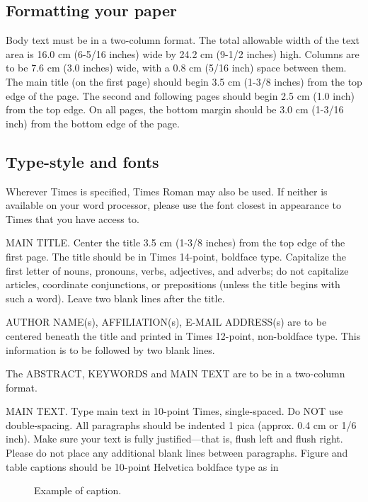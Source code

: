 \subsection{Formatting your paper}

Body text must be in a two-column format. The total allowable width of
the text area is 16.0 cm (6-5/16 inches) wide by 24.2 cm (9-1/2
inches) high. Columns are to be 7.6 cm (3.0 inches) wide, with a 0.8 cm
(5/16 inch) space between them. The main title (on the first page)
should begin 3.5 cm (1-3/8 inches) from the top edge of the page. The
second and following pages should begin 2.5 cm (1.0 inch) from the top
edge. On all pages, the bottom margin should be 3.0 cm (1-3/16 inch)
from the bottom edge of the page.

\subsection{Type-style and fonts}

Wherever Times is specified, Times Roman may also be used. If neither is 
available on your word processor, please use the font closest in 
appearance to Times that you have access to.

MAIN TITLE. Center the title 3.5 cm (1-3/8 inches) from the top edge of 
the first page. The title should be in Times 14-point, boldface type. 
Capitalize the first letter of nouns, pronouns, verbs, adjectives, and 
adverbs; do not capitalize articles, coordinate conjunctions, or 
prepositions (unless the title begins with such a word). Leave two blank 
lines after the title.

AUTHOR NAME(s), AFFILIATION(s), E-MAIL ADDRESS(s) are to be centered
beneath the title and printed in Times 12-point, non-boldface
type. This information is to be followed by two blank lines.

The ABSTRACT, KEYWORDS and MAIN TEXT are to be in a two-column format. 

MAIN TEXT. Type main text in 10-point Times, single-spaced. Do NOT use 
double-spacing. All paragraphs should be indented 1 pica (approx. 
0.4 cm or 1/6 inch). Make sure your text is fully justified---that is, 
flush left and flush right. Please do not place any additional blank 
lines between paragraphs. Figure and table captions should be 10-point 
Helvetica boldface type as in
\begin{figure}[h]
   \caption{Example of caption.}
\end{figure}

